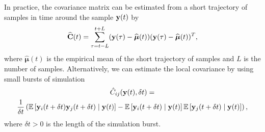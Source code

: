 
In practice, the covariance matrix can be estimated from a short trajectory of samples in time around the sample $\mathbf{y}(t)$ by
\begin{equation} \label{eq:cov1}
	\widehat{\mathbf{C}}(t) = \sum \limits _{\tau = t-L}^{t+L} (\mathbf{y}(\tau) - \widehat{\boldsymbol{\mu}}(t))(\mathbf{y}(\tau) - \widehat{\boldsymbol{\mu}}(t))^T,
\end{equation}
where $\widehat{\boldsymbol{\mu}}(t)$ is the empirical mean of the short trajectory of samples and $L$ is the number of samples.
%
Alternatively, we can estimate the local covariance by using small bursts of simulation 
\begin{multline} \label{eq:cov2}
\hat{C}_{ij}(\mathbf{y}(t), \delta t)
= \\
\frac{1}{ \delta t} \left( \mathbb{E} \left[ \mathbf{y}_i (t+\delta t) \mathbf{y}_j (t+ \delta t) \mid \mathbf{y}(t) \right]
- \mathbb{E} \left[ \mathbf{y}_i (t+\delta t) \mid \mathbf{y}(t) \right] \mathbb{E} \left[ \mathbf{y}_j (t+\delta t) \mid \mathbf{y}(t) \right] \right) ,
\end{multline}
%
where $\delta t > 0$ is the length of the simulation burst.
%

